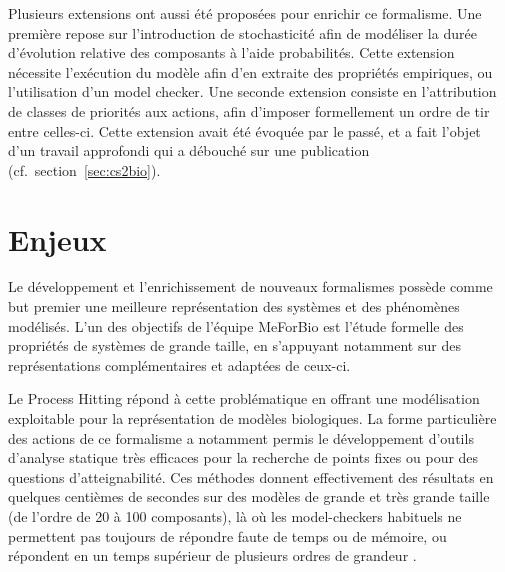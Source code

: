 Plusieurs extensions ont aussi été proposées pour enrichir ce formalisme.
Une première repose sur l'introduction de stochasticité afin de modéliser la durée d'évolution relative des composants à l'aide probabilités.
Cette extension nécessite l'exécution du modèle afin d'en extraite des propriétés empiriques, ou l'utilisation d'un model checker.
Une seconde extension consiste en l'attribution de classes de priorités aux actions, afin d'imposer formellement un ordre de tir entre celles-ci.
Cette extension avait été évoquée par le passé, et a fait l'objet d'un travail approfondi qui a débouché sur une publication (cf.~section~\ref{sec:cs2bio}).



\section{Enjeux}

Le développement et l'enrichissement de nouveaux formalismes possède comme but premier une meilleure représentation des systèmes et des phénomènes modélisés.
L'un des objectifs de l'équipe MeForBio est l'étude formelle des propriétés de systèmes de grande taille,
en s'appuyant notamment sur des représentations complémentaires et adaptées de ceux-ci.

Le Process Hitting répond à cette problématique en offrant une modélisation exploitable pour la représentation de modèles biologiques.
La forme particulière des actions de ce formalisme a notamment permis le développement d'outils d'analyse statique très efficaces pour la recherche de points fixes ou pour des questions d'atteignabilité.
Ces méthodes donnent effectivement des résultats en quelques centièmes de secondes sur des modèles de grande et très grande taille (de l'ordre de 20 à 100 composants), là où les model-checkers habituels ne permettent pas toujours de répondre faute de temps ou de mémoire, ou répondent en un temps supérieur de plusieurs ordres de grandeur \cite{PMR12-MSCS}.

